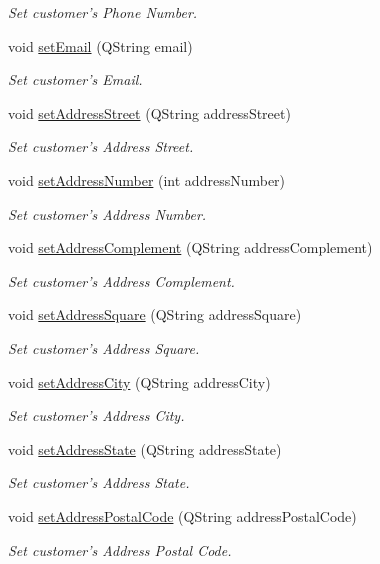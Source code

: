 \begin{DoxyCompactItemize}
\begin{DoxyCompactList}\small\item\em \-Set customer's \-Phone \-Number. \end{DoxyCompactList}\item 
void \hyperlink{class_customer_a213bbe7a81a6cbe434de39a53c064bbf}{set\-Email} (\-Q\-String email)
\begin{DoxyCompactList}\small\item\em \-Set customer's \-Email. \end{DoxyCompactList}\item 
void \hyperlink{class_customer_a43b943e0b545b6354762085b9987c0af}{set\-Address\-Street} (\-Q\-String address\-Street)
\begin{DoxyCompactList}\small\item\em \-Set customer's \-Address \-Street. \end{DoxyCompactList}\item 
void \hyperlink{class_customer_a9741012b1bc78c557dc32802f8b65dc3}{set\-Address\-Number} (int address\-Number)
\begin{DoxyCompactList}\small\item\em \-Set customer's \-Address \-Number. \end{DoxyCompactList}\item 
void \hyperlink{class_customer_ab1d9fa503d1e4c9a19ec4065225344a3}{set\-Address\-Complement} (\-Q\-String address\-Complement)
\begin{DoxyCompactList}\small\item\em \-Set customer's \-Address \-Complement. \end{DoxyCompactList}\item 
void \hyperlink{class_customer_aa84495e8bab16a9e322a1193272485fa}{set\-Address\-Square} (\-Q\-String address\-Square)
\begin{DoxyCompactList}\small\item\em \-Set customer's \-Address \-Square. \end{DoxyCompactList}\item 
void \hyperlink{class_customer_a2494189ff743900cb5412851f0eaa275}{set\-Address\-City} (\-Q\-String address\-City)
\begin{DoxyCompactList}\small\item\em \-Set customer's \-Address \-City. \end{DoxyCompactList}\item 
void \hyperlink{class_customer_a535c384e6fa584f2cfb64a9da211a873}{set\-Address\-State} (\-Q\-String address\-State)
\begin{DoxyCompactList}\small\item\em \-Set customer's \-Address \-State. \end{DoxyCompactList}\item 
void \hyperlink{class_customer_a3bd8c015c319404adb621fc512849d61}{set\-Address\-Postal\-Code} (\-Q\-String address\-Postal\-Code)
\begin{DoxyCompactList}\small\item\em \-Set customer's \-Address \-Postal \-Code. \end{DoxyCompactList}\end{DoxyCompactItemize}


